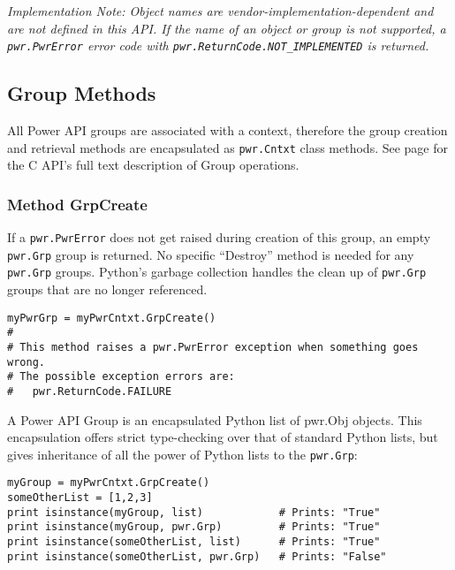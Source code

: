\emph{Implementation Note: Object names are vendor-implementation-dependent and
are not defined in this API. If the name of an object or group is not supported,
a \texttt{pwr.PwrError} error code with \texttt{pwr.ReturnCode.NOT_IMPLEMENTED}
is returned.}

\subsection{Group Methods} \label{sec:PythonGroupMethods}

All Power API groups are associated with a context, therefore the group
creation and retrieval methods are encapsulated as \texttt{pwr.Cntxt} class
methods. See page \pageref{sec:Group} for the C API's full text description of
Group operations.

\subsubsection{Method GrpCreate} \label{meth:GrpCreate}

If a \texttt{pwr.PwrError} does not get raised during creation of this group,
an empty \texttt{pwr.Grp} group is returned. No specific ``Destroy'' method is
needed for any \texttt{pwr.Grp} groups. Python's garbage collection handles the
clean up of \texttt{pwr.Grp} groups that are no longer referenced.

\begin{center}\begin{minipage}{.95\linewidth}\begin{lstlisting}
myPwrGrp = myPwrCntxt.GrpCreate()
#
# This method raises a pwr.PwrError exception when something goes wrong.
# The possible exception errors are:
#   pwr.ReturnCode.FAILURE
\end{lstlisting}\end{minipage}\end{center}

A Power API Group is an encapsulated Python list of pwr.Obj objects.
This encapsulation offers strict type-checking over that of standard Python
lists, but gives inheritance of all the power of Python lists to the
\texttt{pwr.Grp}:

\begin{center}\begin{minipage}{.95\linewidth}\begin{lstlisting}
myGroup = myPwrCntxt.GrpCreate()
someOtherList = [1,2,3]
print isinstance(myGroup, list)            # Prints: "True"
print isinstance(myGroup, pwr.Grp)         # Prints: "True"
print isinstance(someOtherList, list)      # Prints: "True"
print isinstance(someOtherList, pwr.Grp)   # Prints: "False"
\end{lstlisting}\end{minipage}\end{center}

